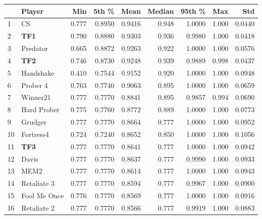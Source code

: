 \begin{tabular}{llrrrrrrr}
\toprule
{} &        Player &    Min &   5th \% &    Mean &  Median &  95th \% &    Max &     Std \\
\midrule
1  &            CS &  0.777 &  0.8950 &  0.9416 &   0.948 &  1.0000 &  1.000 &  0.0440 \\
2  &           \textbf{TF1} &  0.790 &  0.8880 &  0.9303 &   0.936 &  0.9980 &  1.000 &  0.0418 \\
3  &      Predator &  0.665 &  0.8872 &  0.9263 &   0.922 &  1.0000 &  1.000 &  0.0576 \\
4  &           \textbf{TF2} &  0.746 &  0.8730 &  0.9248 &   0.939 &  0.9889 &  0.998 &  0.0437 \\
5  &     Handshake &  0.410 &  0.7544 &  0.9152 &   0.920 &  1.0000 &  1.000 &  0.0948 \\
6  &      Prober 4 &  0.763 &  0.7740 &  0.9063 &   0.895 &  1.0000 &  1.000 &  0.0659 \\
7  &      Winner21 &  0.777 &  0.7770 &  0.8841 &   0.895 &  0.9857 &  0.994 &  0.0690 \\
8  &   Hard Prober &  0.775 &  0.7760 &  0.8772 &   0.889 &  1.0000 &  1.000 &  0.0773 \\
9  &       Grudger &  0.777 &  0.7770 &  0.8664 &   0.777 &  1.0000 &  1.000 &  0.0952 \\
10 &     Fortress4 &  0.724 &  0.7240 &  0.8652 &   0.850 &  1.0000 &  1.000 &  0.1056 \\
11 &           \textbf{TF3} &  0.777 &  0.7770 &  0.8641 &   0.777 &  1.0000 &  1.000 &  0.0942 \\
12 &         Davis &  0.777 &  0.7770 &  0.8637 &   0.777 &  0.9990 &  1.000 &  0.0933 \\
13 &          MEM2 &  0.777 &  0.7770 &  0.8614 &   0.777 &  1.0000 &  1.000 &  0.0943 \\
14 &   Retaliate 3 &  0.777 &  0.7770 &  0.8594 &   0.777 &  0.9967 &  1.000 &  0.0900 \\
15 &  Fool Me Once &  0.776 &  0.7770 &  0.8569 &   0.777 &  1.0000 &  1.000 &  0.0916 \\
16 &   Retaliate 2 &  0.777 &  0.7770 &  0.8566 &   0.777 &  0.9919 &  1.000 &  0.0883 \\
\bottomrule
\end{tabular}
